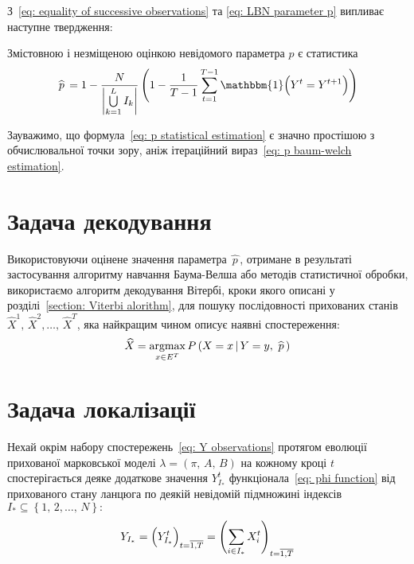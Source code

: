 З~\eqref{eq: equality of successive observations} та \eqref{eq: LBN parameter p} випливає наступне твердження:

\begin{claim}
    Змістовною і незміщеною оцінкою невідомого параметра $p$ є статистика
    \begin{equation}\label{eq: p statistical estimation}
        \widehat{\,p\,} = 1-\frac{N}{\left| \bigcup\limits_{k=1}^{L}I_k \right|} \left( 1-\frac{1}{T-1}\sum_{t=1}^{T-1}\mathbbm{1} \Bigl( Y^t=Y^{t+1} \Bigr) \right)
    \end{equation}
\end{claim}

Зауважимо, що формула~\eqref{eq: p statistical estimation} є значно простішою з обчислювальної точки зору, аніж ітераційний вираз~\eqref{eq: p baum-welch estimation}.

\section{Задача декодування}

Використовуючи оцінене значення параметра $\widehat{\,p\,}$, отримане в результаті застосування алгоритму навчання Баума-Велша або методів статистичної обробки, використаємо алгоритм декодування Вітербі, кроки якого описані у розділі~\ref{section: Viterbi alorithm}, для пошуку послідовності прихованих станів $\widehat{X}^1,\,\widehat{X}^2,\ldots,\,\widehat{X}^T$, яка найкращим чином описує наявні спостереження:
\begin{equation}\label{eq: decoded stated}
    \widehat{X} = \operatorname*{argmax}\limits_{x \in E^T} P\left( X=x\,|\,Y=y,\,\widehat{\,p\,} \right)
\end{equation}

\section{Задача локалізації}

Нехай окрім набору спостережень~\eqref{eq: Y observations} протягом еволюції прихованої марковської моделі $\lambda=(\pi,\,A,\,B)$ на кожному кроці $t$ спостерігається деяке додаткове значення $Y^t_{I_*}$ функціонала~\eqref{eq: phi function} від прихованого стану ланцюга по деякій невідомій підмножині індексів $I_* \subseteq \left\{ 1,\,2,\ldots,\,N \right\}:$
\begin{equation*}
    Y_{I_*} = \Bigl( Y^t_{I_*} \Bigr)_{t=\overline{1,T}} = \left( \sum_{i \in I_*} X^t_i \right)_{t=\overline{1,T}} 
\end{equation*}

